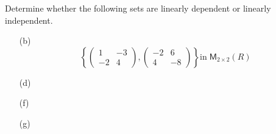Determine whether the following sets are linearly dependent or
linearly independent.
\begin{enumerate}
\item[(b)] 
\[
\left\{\begin{pmatrix}
1 & -3\\
-2 & 4
\end{pmatrix}
,
\begin{pmatrix}
-2 & 6\\
4 & -8
\end{pmatrix}\right\} 
\text{in}\;\mathsf{M}_{2\times2}(R)\]

\item[(d)]

\item[(f)]
\item[(g)]
\end{enumerate}
